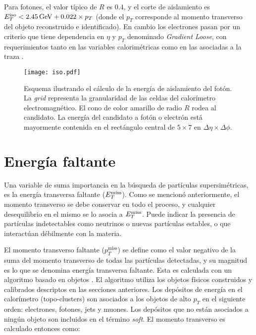 Para fotones, el valor típico de $R$ es $0.4$, y el corte de aislamiento es $E_{T}^{\text{iso}}<2.45 \, \mathrm{GeV} + 0.022 \times p_{T}$ (donde el $p_{T}$ corresponde al momento transverso del objeto reconstruido e identificado). En cambio los electrones pasan por un criterio que tiene dependencia en $\eta$ y $p_{T}$ denominado \textit{Gradient Loose}, con requerimientos tanto en las variables calorimétricas como en las asociadas a la traza \cite{ATL-PHYS-PUB-2015-037}.



\begin{figure}
\centering
\texttt{[image: iso.pdf]}
\caption{Esquema ilustrando el cálculo de la energía de aislamiento del fotón. La \textit{grid} representa la granularidad de las celdas del calorímetro electromagnético. El cono de color amarillo de radio $R$ rodea al candidato. La energía del candidato a fotón o electrón está mayormente contenida en el rectángulo central de $5 \times 7$ en $\Delta\eta \times \Delta\phi$.}
\label{isolation}
\end{figure}

\section{Energía faltante}

Una variable de suma importancia en la búsqueda de partículas supersimétricas, es la energía transversa faltante ($E_{T}^{\text{miss}}$). Como se mencionó anteriormente, el momento transverso se debe conservar en todo el proceso, y cualquier desequilibrio en el mismo se lo asocia a $E_{T}^{\text{miss}}$. Puede indicar la presencia de partículas indetectables como neutrinos o nuevas partículas estables, o que interactúan débilmente con la materia.

El momento transverso faltante ($p_{T}^{\text{miss}}$) se define como el valor negativo de la suma del momento transverso de todas las partículas detectadas, y su magnitud es lo que se denomina energía transversa faltante. Esta es calculada con un algoritmo basado en objetos \cite{Khoo:2012749}. El algoritmo utiliza los objetos físicos construidos y calibrados descriptos en las secciones anteriores. Los depósitos de energía en el calorímetro (topo-clusters) son asociados a los objetos de alto $p_{T}$ en el siguiente orden: electrones, fotones, jets y muones. Los depósitos que no están asociados a ningún objeto son incluidos en el término \textit{soft}. El momento transverso es calculado entonces como:

